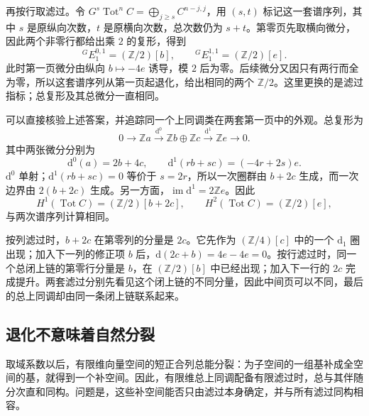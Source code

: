 再按行取滤过。令 \(G^s\operatorname{Tot}^nC=\bigoplus_{j\ge s}C^{n-j,j}\)，用 \((s,t)\) 标记这一套谱序列，其中 \(s\) 是原纵向次数，\(t\) 是原横向次数，总次数仍为 \(s+t\)。第零页先取横向微分，因此两个非零行都给出乘 \(2\) 的复形，得到
\[
	{}^GE_1^{0,1}=(\mathbb Z/2)[b],\qquad
	{}^GE_1^{1,1}=(\mathbb Z/2)[e].
\]
此时第一页微分由纵向 \(b\mapsto-4e\) 诱导，模 \(2\) 后为零。后续微分又因只有两行而全为零，所以这套谱序列从第一页起退化，给出相同的两个 \(\mathbb Z/2\)。这里更换的是滤过指标；总复形及其总微分一直相同。

\ProseParagraphBreak

可以直接核验上述答案，并追踪同一个上同调类在两套第一页中的外观。总复形为
\begin{equation}\label{g2:eq:two-filtrations-total-complex}
	0\longrightarrow\mathbb Z a
	\xrightarrow{\mathrm d^0}\mathbb Z b\oplus\mathbb Z c
	\xrightarrow{\mathrm d^1}\mathbb Z e\longrightarrow0.
\end{equation}
其中两张微分分别为
\[
	\mathrm d^0(a)=2b+4c,\qquad
	\mathrm d^1(rb+sc)=(-4r+2s)e.
\]
\(\mathrm d^0\) 单射；\(\mathrm d^1(rb+sc)=0\) 等价于 \(s=2r\)，所以一次圈群由 \(b+2c\) 生成，而一次边界由 \(2(b+2c)\) 生成。另一方面，\(\operatorname{im}\mathrm d^1=2\mathbb Z e\)。因此
\[
	H^1(\operatorname{Tot}C)=(\mathbb Z/2)[b+2c],\qquad
	H^2(\operatorname{Tot}C)=(\mathbb Z/2)[e],
\]
与两次谱序列计算相同。

\ProseParagraphBreak

按列滤过时，\(b+2c\) 在第零列的分量是 \(2c\)。它先作为 \((\mathbb Z/4)[c]\) 中的一个 \(\mathrm d_1\) 圈出现；加入下一列的修正项 \(b\) 后，\(\mathrm d(2c+b)=4e-4e=0\)。按行滤过时，同一个总闭上链的第零行分量是 \(b\)，在 \((\mathbb Z/2)[b]\) 中已经出现；加入下一行的 \(2c\) 完成提升。两套滤过分别先看见这个闭上链的不同分量，因此中间页可以不同，最后的总上同调却由同一条闭上链联系起来。

\subsection{退化不意味着自然分裂}
\label{g2:subsec:1005:03}

取域系数以后，有限维向量空间的短正合列总能分裂：为子空间的一组基补成全空间的基，就得到一个补空间。因此，有限维总上同调配备有限滤过时，总与其伴随分次直和同构。问题是，这些补空间能否只由滤过本身确定，并与所有滤过同构相容。

